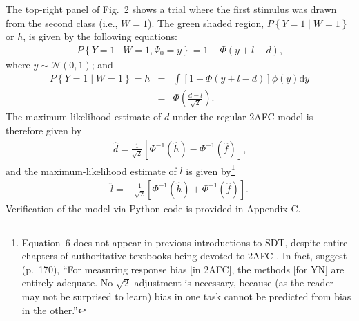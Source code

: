 \documentclass[man]{apa6}
\begin{document}
The top-right panel of Fig.~2 shows a trial where the first stimulus was drawn from the second class (i.e., $W=1$). The green shaded region, $P\left\{Y=1\mid{}W=1\right\}$ or $h$, is given by the following equations:
\begin{eqnarray*}
P\left\{Y=1\mid{}W=1,\Psi_0=y\right\}=1-\Phi\left(y+l-d\right)\textrm{,}
\end{eqnarray*} where $y\sim\mathcal{N}\left(0,1\right)$; and
\begin{eqnarray*}
P\left\{Y=1\mid{}W=1\right\}=h&=&\int\!\left[1-\Phi\left(y+l-d\right)\right]\phi\left(y\right)\textrm{d}y\\
&=&\Phi\left(\frac{d-l}{\sqrt{2}}\right)\textrm{.}
\end{eqnarray*}
The maximum-likelihood estimate of $d$ under the regular 2AFC model is therefore given by
\begin{eqnarray}
\hat{d}=\frac{1}{\sqrt{2}}\left[\Phi^{-1}\left(\hat{h}\right)-\Phi^{-1}\left(\hat{f}\right)\right]\textrm{,}
\label{eq5}
\end{eqnarray} and the maximum-likelihood estimate of $l$ is given by\footnote{Equation~6 does not appear in previous introductions to SDT, despite entire chapters of authoritative textbooks being devoted to 2AFC \parencite[e.g.,][]{Green1966, Macmillan2005}. In fact, \citeauthor{Macmillan2005} suggest (p.~170), ``For measuring response bias [in 2AFC], the methods [for YN] are entirely adequate. No $\sqrt{2}$ adjustment is necessary, because (as the reader may not be surprised to learn) bias in one task cannot be predicted from bias in the other.''}
\begin{eqnarray}
\hat{l}=-\frac{1}{\sqrt{2}}\left[\Phi^{-1}\left(\hat{h}\right)+\Phi^{-1}\left(\hat{f}\right)\right]\textrm{.}
\label{eq6}
\end{eqnarray}Verification of the model via Python code is provided in Appendix C.
\end{document}
